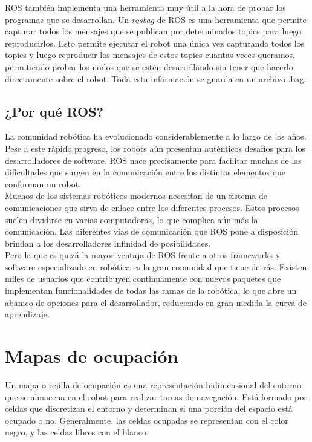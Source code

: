 ROS también implementa una herramienta muy útil a la hora de probar los programas que se desarrollan. Un \textit{rosbag} de ROS es una herramienta que permite capturar todos los mensajes que se publican por determinados topics para luego reproducirlos. Esto permite ejecutar el robot una única vez capturando todos los topics y luego reproducir los mensajes de estos topics cuantas veces queramos, permitiendo probar los nodos que se estén desarrollando sin tener que hacerlo directamente sobre el robot. Toda esta información se guarda en un archivo .bag.\\

\subsection{¿Por qué ROS?}

La comunidad robótica ha evolucionado considerablemente a lo largo de los años. Pese a  este rápido progreso, los robots aún presentan auténticos desafíos para los desarrolladores de software. ROS nace precisamente para facilitar muchas de las dificultades que surgen en la comunicación entre los distintos elementos que conforman un robot.\\

Muchos de los sistemas robóticos modernos necesitan de un sistema de comunicaciones que sirva de enlace entre los diferentes procesos. Estos procesos suelen dividirse en varias computadoras, lo que complica aún más la comunicación. Las diferentes vías de comunicación que ROS pone a disposición brindan a los desarrolladores infinidad de posibilidades.\\

Pero la que es quizá la mayor ventaja de ROS frente a otros frameworks y software especializado en robótica es la gran comunidad que tiene detrás. Existen miles de usuarios que contribuyen continuamente con nuevos paquetes que implementan funcionalidades de todas las ramas de la robótica, lo que abre un abanico de opciones para el desarrollador, reduciendo en gran medida la curva de aprendizaje.\\

\section{Mapas de ocupación}

Un mapa o rejilla de ocupación es una representación bidimensional del entorno que se almacena en el robot para realizar tareas de navegación. Está formado por celdas que discretizan el entorno y determinan si una porción del espacio está ocupado o no. Generalmente, las celdas ocupadas se representan con el color negro, y las celdas libres con el blanco.\\

